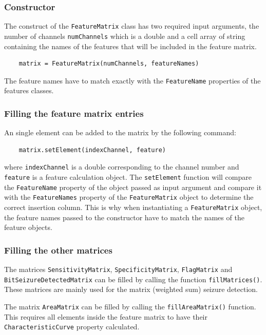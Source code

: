 \documentclass[usletter, 11pt]{extarticle}
\begin{document}
\subsubsection{Constructor}

The construct of the \verb|FeatureMatrix| class has two required input arguments, the number of channels \verb|numChannels| which is a double and a cell array of string containing the names of the features that will be included in the feature matrix.
\begin{Verbatim}
	matrix = FeatureMatrix(numChannels, featureNames)	
\end{Verbatim}

The feature names have to match exactly with the \verb|FeatureName| properties of the features classes. 

\subsubsection{Filling the feature matrix entries}

An single element can be added to the matrix by the following command:
\begin{Verbatim}
	matrix.setElement(indexChannel, feature)	
\end{Verbatim}
where \verb|indexChannel| is a double corresponding to the channel number and \verb|feature| is a feature calculation object. The \verb|setElement| function will compare the \verb|FeatureName| property of the object passed as input argument and compare it with the \verb|FeatureNames| property of the \verb|FeatureMatrix| object to determine the correct insertion column. This is why when instantiating a \verb|FeatureMatrix| object, the feature names passed to the constructor have to match the names of the feature objects.

\subsubsection{Filling the other matrices}

The matrices \verb|SensitivityMatrix|, \verb|SpecificityMatrix|, \verb|FlagMatrix| and \verb|BitSeizureDetectedMatrix| can be filled by calling the function \verb|fillMatrices()|. These matrices are mainly used for the matrix (weighted sum) seizure detection.

The matrix \verb|AreaMatrix| can be filled by calling the \verb|fillAreaMatrix()| function. This requires all elements inside the feature matrix to have their \verb|CharacteristicCurve| property calculated.
\end{document}
